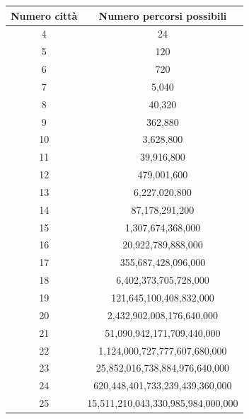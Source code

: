 \documentclass[a4paper,12pt]{report}
\begin{document}
\begin{center}
        \begin{tabular}{|c|c|}
                \hline
                \textbf{Numero città} & \textbf{Numero percorsi possibili} \\ %
                \hline %
                4 & 24 \\
                \hline
                5 & 120 \\
                \hline
                6 & 720 \\
                \hline
                7 & 5,040 \\
                \hline
                8 & 40,320 \\
                \hline
                9 & 362,880 \\
                \hline
                10 & 3,628,800 \\
                \hline
                11 & 39,916,800 \\
                \hline
                12 & 479,001,600 \\
                \hline
                13 & 6,227,020,800 \\
                \hline
                14 & 87,178,291,200 \\
                \hline
                15 & 1,307,674,368,000 \\
                \hline
                16 & 20,922,789,888,000 \\
                \hline
                17 & 355,687,428,096,000 \\
                \hline
                18 & 6,402,373,705,728,000 \\
                \hline
                19 & 121,645,100,408,832,000 \\
                \hline
                20 & 2,432,902,008,176,640,000 \\
                \hline
                21 & 51,090,942,171,709,440,000 \\
                \hline
                22 & 1,124,000,727,777,607,680,000 \\
                \hline
                23 & 25,852,016,738,884,976,640,000 \\
                \hline
                24 & 620,448,401,733,239,439,360,000 \\
                \hline
                25 & 15,511,210,043,330,985,984,000,000 \\
                \hline
        \end{tabular}
        \newline
\end{center}
\end{document}
